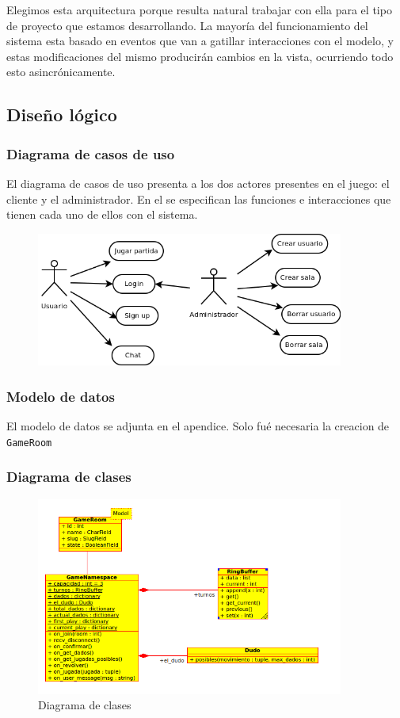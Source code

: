 \documentclass[a4paper,11pt]{article}
\begin{document}
Elegimos esta arquitectura porque resulta natural trabajar con ella 
para el tipo de proyecto que estamos desarrollando. La mayoría del 
funcionamiento del sistema esta basado en eventos que van a gatillar 
interacciones con el modelo, y estas modificaciones del mismo producirán 
cambios en la vista, ocurriendo todo esto asincrónicamente.
\newpage
\subsection{Diseño lógico}
\subsubsection{Diagrama de casos de uso}
	El diagrama de casos de uso presenta a los dos actores presentes en
el juego: el cliente y el administrador. En el se especifican las funciones e
interacciones que tienen cada uno de ellos con el sistema.
\begin{figure}[h!]
	\centering
	\includegraphics[width=0.9\textwidth]{diag_casos_uso.png}
\end{figure}

\subsubsection{Modelo de datos}
El modelo de datos se adjunta en el apendice. Solo fué necesaria la creacion de \texttt{GameRoom}
\subsubsection{Diagrama de clases}
\begin{figure}[h!]
	\centering
	\includegraphics[width=0.9\textwidth]{dc.png}
	\caption{Diagrama de clases}
\end{figure}
\end{document}
